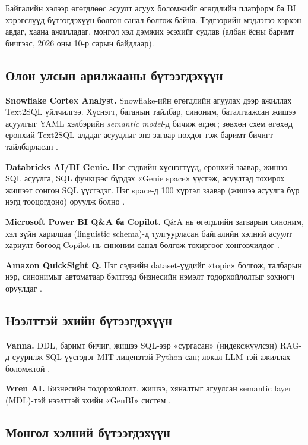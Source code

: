 Байгалийн хэлээр өгөгдлөөс асуулт асуух боломжийг өгөгдлийн платформ ба BI хэрэгслүүд бүтээгдэхүүн болгон санал болгож
байна. Тэдгээрийн мэдлэгээ хэрхэн авдаг, хаана ажилладаг, монгол хэл дэмжих эсэхийг судлав (албан ёсны баримт бичгээс,
2026 оны 10-р сарын байдлаар).

\subsection{Олон улсын арилжааны бүтээгдэхүүн}

\textbf{Snowflake Cortex Analyst.} Snowflake-ийн өгөгдлийн агуулах дээр ажиллах Text2SQL үйлчилгээ. Хүснэгт, баганын
тайлбар, синоним, баталгаажсан жишээ асуулгыг YAML хэлбэрийн \emph{semantic model}-д бичиж өгдөг; зөвхөн схем өгөхөд
ерөнхий Text2SQL алддаг асуудлыг энэ загвар нөхдөг гэж баримт бичигт тайлбарласан \cite{snowflake_cortex_analyst}.

\textbf{Databricks AI/BI Genie.} Нэг сэдвийн хүснэгтүүд, ерөнхий заавар, жишээ SQL асуулга, SQL функцээс бүрдэх «Genie
space» үүсгэж, асуултад тохирох жишээг сонгон SQL үүсгэдэг. Нэг space-д 100 хүртэл заавар (жишээ асуулга бүр нэгд
тооцогдоно) оруулж болно \cite{databricks_genie}.

\textbf{Microsoft Power BI Q\&A ба Copilot.} Q\&A нь өгөгдлийн загварын синоним, хэл зүйн харилцаа (linguistic schema)-д
тулгуурласан байгалийн хэлний асуулт хариулт бөгөөд Copilot нь синоним санал болгож тохиргоог хөнгөвчилдөг
\cite{powerbi_qna}.

\textbf{Amazon QuickSight Q.} Нэг сэдвийн dataset-үүдийг «topic» болгож, талбарын нэр, синонимыг автоматаар бэлтгээд
бизнесийн нэмэлт тодорхойлолтыг зохиогч оруулдаг \cite{aws_quicksight_q}.

\subsection{Нээлттэй эхийн бүтээгдэхүүн}

\textbf{Vanna.} DDL, баримт бичиг, жишээ SQL-ээр «сургасан» (индексжүүлсэн) RAG-д суурилж SQL үүсгэдэг MIT лицензтэй
Python сан; локал LLM-тэй ажиллах боломжтой \cite{vanna_ai}.

\textbf{Wren AI.} Бизнесийн тодорхойлолт, жишээ, хяналтыг агуулсан semantic layer (MDL)-тэй нээлттэй эхийн «GenBI» систем
\cite{wren_ai}.

\subsection{Монгол хэлний бүтээгдэхүүн}


